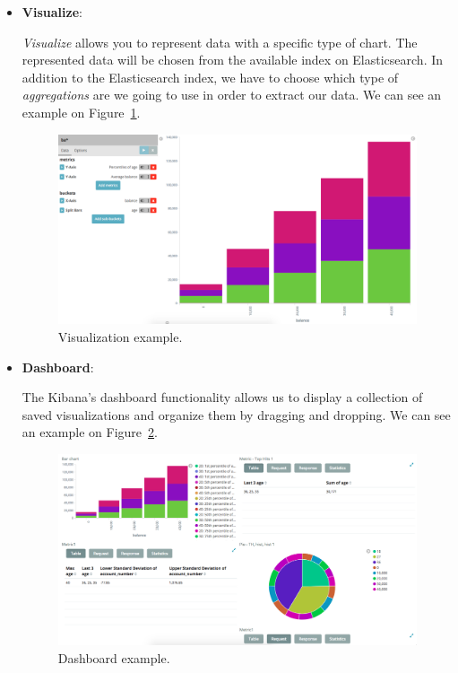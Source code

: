 \documentclass[a4paper, 12pt, english]{book}
\begin{document}
\begin{itemize}
    \item \textbf{Visualize}:

        \textit{Visualize} allows you to represent data with a specific type of chart. The represented data will be chosen from the available index on Elasticsearch. In addition to the Elasticsearch index, we have to choose which type of \textit{aggregations} are we going to use in order to extract our data. We can see an example on Figure~\ref{fig:kibana-visualization-example}.
        \begin{figure}
          \centering
          \includegraphics[width=15cm, keepaspectratio]{img/kibana-visualization-example}
          \caption{Visualization example.}
          \label{fig:kibana-visualization-example}
        \end{figure}
    \item \textbf{Dashboard}:

        The Kibana's dashboard functionality allows us to display a collection of saved visualizations and organize them by dragging and dropping. We can see an example on Figure~\ref{fig:kibana-dashboard-example}.
        \begin{figure}
          \centering
          \includegraphics[width=15cm, keepaspectratio]{img/kibana-dashboard-example}
          \caption{Dashboard example.}
          \label{fig:kibana-dashboard-example}
        \end{figure}
\end{itemize}
\end{document}
